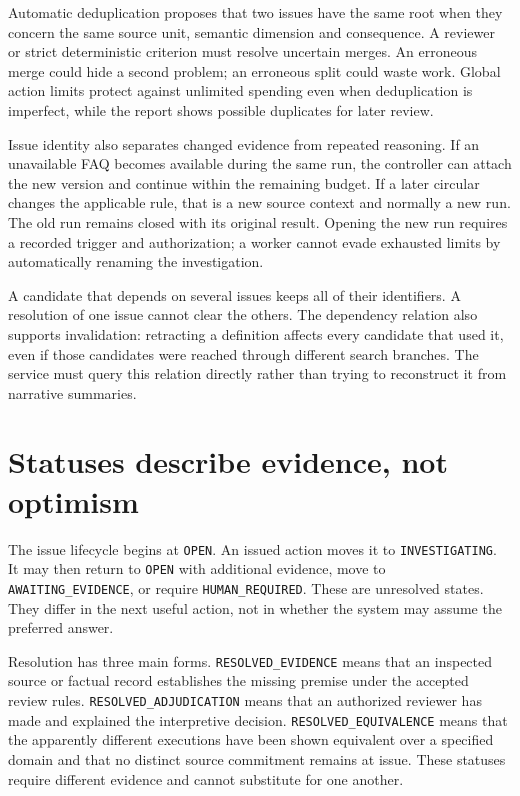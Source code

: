 \documentclass[12pt,a4paper,oneside,openany]{book}
\begin{document}
Automatic deduplication proposes that two issues have the same root when they
concern the same source unit, semantic dimension and consequence. A reviewer or
strict deterministic criterion must resolve uncertain merges. An erroneous merge
could hide a second problem; an erroneous split could waste work. Global action
limits protect against unlimited spending even when deduplication is imperfect,
while the report shows possible duplicates for later review.

Issue identity also separates changed evidence from repeated reasoning. If an
unavailable FAQ becomes available during the same run, the controller can attach
the new version and continue within the remaining budget. If a later circular
changes the applicable rule, that is a new source context and normally a new run.
The old run remains closed with its original result. Opening the new run requires
a recorded trigger and authorization; a worker cannot evade exhausted limits by
automatically renaming the investigation.

A candidate that depends on several issues keeps all of their identifiers. A
resolution of one issue cannot clear the others. The dependency relation also
supports invalidation: retracting a definition affects every candidate that used
it, even if those candidates were reached through different search branches.
The service must query this relation directly rather than trying to reconstruct
it from narrative summaries.

\section{Statuses describe evidence, not optimism}

The issue lifecycle begins at \texttt{OPEN}. An issued action moves it to
\texttt{INVESTIGATING}. It may then return to \texttt{OPEN} with additional evidence,
move to \texttt{AWAITING\_EVIDENCE}, or require \texttt{HUMAN\_REQUIRED}. These are
unresolved states. They differ in the next useful action, not in whether the
system may assume the preferred answer.

Resolution has three main forms. \texttt{RESOLVED\_EVIDENCE} means that an inspected
source or factual record establishes the missing premise under the accepted
review rules. \texttt{RESOLVED\_ADJUDICATION} means that an authorized reviewer has
made and explained the interpretive decision. \texttt{RESOLVED\_EQUIVALENCE} means
that the apparently different executions have been shown equivalent over a
specified domain and that no distinct source commitment remains at issue.
These statuses require different evidence and cannot substitute for one another.
\end{document}
